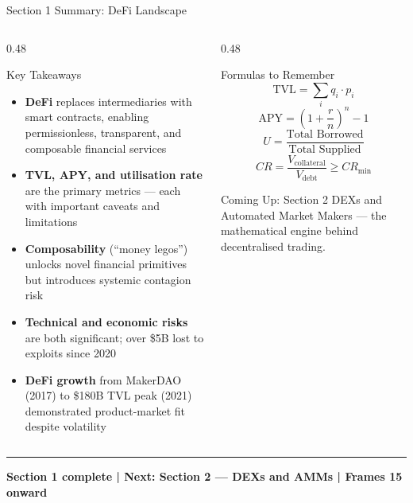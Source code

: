 \documentclass[8pt,aspectratio=169]{beamer}
\newcommand{\bottomnote}[1]{\vfill\vspace{-2mm}\textcolor{mllavender2}{\rule{\textwidth}{0.4pt}}\vspace{1mm}\footnotesize\textbf{#1}}
\begin{document}
\begin{frame}{Section 1 Summary: DeFi Landscape}
  \begin{columns}[T]
    \begin{column}{0.48\textwidth}
      \begin{block}{Key Takeaways}
        \begin{itemize}\setlength\itemsep{4pt}
          \item \textbf{DeFi} replaces intermediaries with smart contracts, enabling permissionless,
                transparent, and composable financial services
          \item \textbf{TVL, APY, and utilisation rate} are the primary metrics --- each with
                important caveats and limitations
          \item \textbf{Composability} (``money legos'') unlocks novel financial primitives but
                introduces systemic contagion risk
          \item \textbf{Technical and economic risks} are both significant; over \$5B lost to
                exploits since 2020
          \item \textbf{DeFi growth} from MakerDAO (2017) to \$180B TVL peak (2021) demonstrated
                product-market fit despite volatility
        \end{itemize}
      \end{block}
    \end{column}
    \begin{column}{0.48\textwidth}
      \begin{block}{Formulas to Remember}
        \[
          \mathrm{TVL} = \sum_{i} q_i \cdot p_i
        \]
        \[
          \mathrm{APY} = \left(1 + \frac{r}{n}\right)^n - 1
        \]
        \[
          U = \frac{\text{Total Borrowed}}{\text{Total Supplied}}
        \]
        \[
          CR = \frac{V_{\text{collateral}}}{V_{\text{debt}}} \geq CR_{\min}
        \]
      \end{block}
      \vspace{3mm}
      \begin{alertblock}{Coming Up: Section 2}
        DEXs and Automated Market Makers --- the mathematical engine behind decentralised trading.
      \end{alertblock}
    \end{column}
  \end{columns}
  \bottomnote{Section 1 complete | Next: Section 2 --- DEXs and AMMs | Frames 15 onward}
\end{frame}
\end{document}
